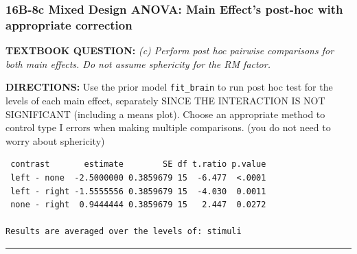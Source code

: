 \documentclass[]{article}
\newenvironment{Shaded}{\begin{snugshade}}{\end{snugshade}}
\newcommand{\KeywordTok}[1]{\textcolor[rgb]{0.13,0.29,0.53}{\textbf{#1}}}
\newcommand{\DataTypeTok}[1]{\textcolor[rgb]{0.13,0.29,0.53}{#1}}
\newcommand{\StringTok}[1]{\textcolor[rgb]{0.31,0.60,0.02}{#1}}
\newcommand{\CommentTok}[1]{\textcolor[rgb]{0.56,0.35,0.01}{\textit{#1}}}
\newcommand{\OperatorTok}[1]{\textcolor[rgb]{0.81,0.36,0.00}{\textbf{#1}}}
\newcommand{\NormalTok}[1]{#1}
\begin{document}
\clearpage

\subsubsection{16B-8c Mixed Design ANOVA: Main Effect's post-hoc with
appropriate
correction}\label{b-8c-mixed-design-anova-main-effects-post-hoc-with-appropriate-correction}

\textbf{TEXTBOOK QUESTION:} \emph{(c) Perform post hoc pairwise
comparisons for both main effects. Do not assume sphericity for the RM
factor.}

\textbf{DIRECTIONS:} Use the prior model \texttt{fit\_brain} to run post
hoc test for the levels of each main effect, separately SINCE THE
INTERACTION IS NOT SIGNIFICANT (including a means plot). Choose an
appropriate method to control type I errors when making multiple
comparisons. (you do not need to worry about sphericity)

\begin{Shaded}
\end{Shaded}

\begin{verbatim}
 contrast       estimate        SE df t.ratio p.value
 left - none  -2.5000000 0.3859679 15  -6.477  <.0001
 left - right -1.5555556 0.3859679 15  -4.030  0.0011
 none - right  0.9444444 0.3859679 15   2.447  0.0272

Results are averaged over the levels of: stimuli 
\end{verbatim}

\begin{center}\rule{0.5\linewidth}{\linethickness}\end{center}

\begin{Shaded}
\end{Shaded}
\end{document}
